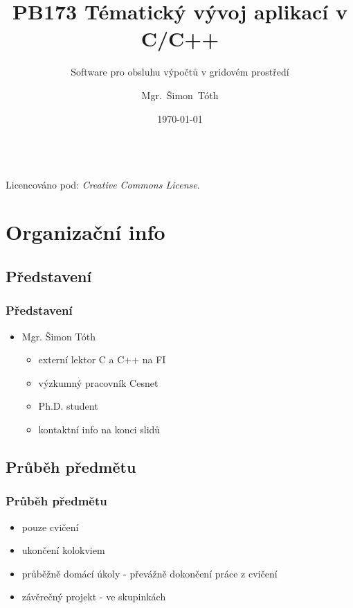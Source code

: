 

\title{PB173 Tématický vývoj aplikací v C/C++}
\subtitle{Software pro obsluhu výpočtů v gridovém prostředí}
\author[]{Mgr.~Šimon~Tóth}
\date{\today}

\newcommand{\CcNote}[1]{%
        Licencováno pod: \textit{Creative Commons #1 3.0 License}.%
}


	\begin{frame}
		\titlepage
		\vfill
		\begin{center}
			\\
			{\tiny\CcNote{\CcLongnameByNcSa}}
			\vspace*{2ex}
		\end{center}
	\end{frame}

\section{Organizační info}
\subsection{Představení}
        
\begin{frame}
	\frametitle{Představení}
	\begin{itemize}
		\item{Mgr. Šimon Tóth}
		\begin{itemize}
			\item{externí lektor C a C++ na FI}
			\item{výzkumný pracovník Cesnet}
			\item{Ph.D. student}
			\item{kontaktní info na konci slidů}
		\end{itemize}
	\end{itemize}
\end{frame}

\subsection{Průběh předmětu}

\begin{frame}
	\frametitle{Průběh předmětu}
	\begin{itemize}
		\item{pouze cvičení}
		\item{ukončení kolokviem}
		\item{průběžně domácí úkoly - převážně dokončení práce z cvičení}
		\item{závěrečný projekt - ve skupinkách}
	\end{itemize}
\end{frame}

